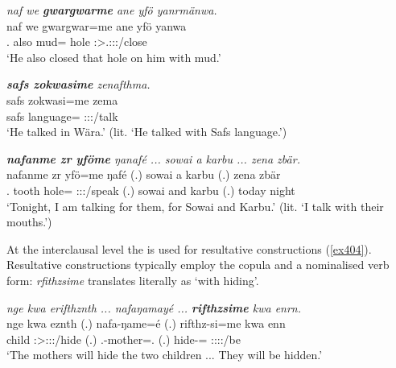 \begin{exe}
	\ex \emph{naf we \textbf{gwargwarme} ane yfö yanrmänwa.}\\
	\gll naf we {gwargwar=me} ane yfö yanwa\\
	\Tsg.{\Erg} also {mud=\Ins} {\Dem} hole \Stsg:\Sbj>\Tsg.\Masc:\Io:\Nonpast:\Ipfv/close\\
	\trans `He also closed that hole on him with mud.'
	\label{ex407}
\end{exe}
\begin{exe}
	\ex \emph{\textbf{safs zokwasime} zenafthma.}\\
	\gll safs zokwasi=me zema\\
	safs language={\Ins} \Stsg:\Sbj:\Pst:\Pfv/talk\\
	\trans `He talked in Wära.' (lit. `He talked with Safs language.')
	\label{ex405}
\end{exe}
\begin{exe}
	\ex \emph{\textbf{nafanme zr yföme} ŋanafé ... sowai a karbu ... zena zbär.}\\
	\gll nafanme zr yfö=me ŋafé (.) sowai a karbu (.) zena zbär\\
	\Tnsg.{\Poss} tooth hole={\Ins} \Fsg:\Sbj:\Nonpast:\Ipfv/speak (.) sowai and karbu (.) today night\\
	\trans `Tonight, I am talking for them, for Sowai and Karbu.' (lit. `I talk with their mouths.')
	\label{ex408}
\end{exe}
	
At the interclausal level the   is used for resultative constructions (\ref{ex404}). Resultative constructions typically employ the copula and a nominalised verb form: \emph{rfithzsime} translates literally as `with hiding'.

\begin{exe}
	\ex \emph{nge kwa erifthznth ... nafaŋamayé ... \textbf{rifthzsime} kwa enrn.}\\
	\gll nge kwa eznth (.) nafa-ŋame=é (.) rifthz-si=me kwa enn\\
	child {\Fut} \Stpl:\Sbj>\Stdu:\Obj:\Nonpast:\Ipfv/hide (.) \Third.\Poss-mother=\Erg.{\Nsg} (.) hide-\Nmlz={\Ins} {\Fut} \Stdu:\Sbj:\Nonpast:\Ipfv:\Venit/be\\
	\trans `The mothers will hide the two children ... They will be hidden.'\\
	\label{ex404}
\end{exe}

